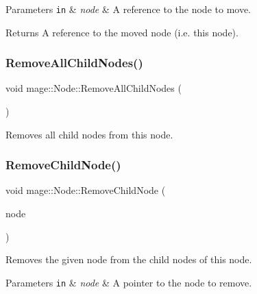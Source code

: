 \begin{DoxyParams}[1]{Parameters}
\mbox{\tt in}  & {\em node} & A reference to the node to move. \\
\hline
\end{DoxyParams}
\begin{DoxyReturn}{Returns}
A reference to the moved node (i.\+e. this node). 
\end{DoxyReturn}
\hypertarget{classmage_1_1_node_a7627e4e280fc9dd13d255c0f64eba79e}{}\label{classmage_1_1_node_a7627e4e280fc9dd13d255c0f64eba79e} 
\subsubsection{\texorpdfstring{Remove\+All\+Child\+Nodes()}{RemoveAllChildNodes()}}
{\footnotesize\ttfamily void mage\+::\+Node\+::\+Remove\+All\+Child\+Nodes (\begin{DoxyParamCaption}{ }\end{DoxyParamCaption})\hspace{0.3cm}{\ttfamily [noexcept]}}

Removes all child nodes from this node. \hypertarget{classmage_1_1_node_a0da235c6459c315ad1c4be5c7aa7c7f0}{}\label{classmage_1_1_node_a0da235c6459c315ad1c4be5c7aa7c7f0} 
\subsubsection{\texorpdfstring{Remove\+Child\+Node()}{RemoveChildNode()}}
{\footnotesize\ttfamily void mage\+::\+Node\+::\+Remove\+Child\+Node (\begin{DoxyParamCaption}\item[{\hyperlink{namespacemage_a1e01ae66713838a7a67d30e44c67703e}{Shared\+Ptr}$<$ \hyperlink{classmage_1_1_node}{Node} $>$}]{node }\end{DoxyParamCaption})}

Removes the given node from the child nodes of this node.


\begin{DoxyParams}[1]{Parameters}
\mbox{\tt in}  & {\em node} & A pointer to the node to remove. \\
\hline
\end{DoxyParams}
\hypertarget{classmage_1_1_node_af123050daa89e50f5468b630061aae53}{}\label{classmage_1_1_node_af123050daa89e50f5468b630061aae53} 
